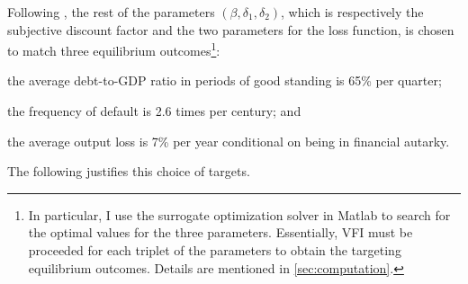 Following \citet{Na-18}, the rest of the parameters $\left( \beta, \delta_1, \delta_2 \right)$, which is respectively the subjective discount factor and the two parameters for the loss function, is chosen to match three equilibrium outcomes\footnote{
    In particular, I use the surrogate optimization solver in Matlab to search for the optimal values for the three parameters. Essentially, VFI must be proceeded for each triplet of the parameters to obtain the targeting equilibrium outcomes. Details are mentioned in \autoref{sec:computation}.
}:
\begin{enumerate*}[label = (\roman*)]
    \item the average debt-to-GDP ratio in periods of good standing is 65\% per quarter;
    \item the frequency of default is 2.6 times per century; and
    \item the average output loss is 7\% per year conditional on being in financial autarky.
\end{enumerate*}
The following justifies this choice of targets.
